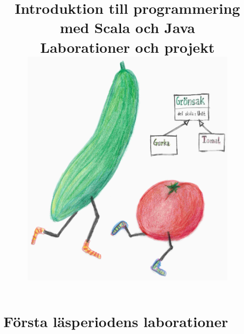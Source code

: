 \documentclass[a4paper]{compendium}
\title{
{\vspace{-3.0cm}\bf\sffamily\Huge\selectfont  Introduktion till programmering med Scala och Java}
\\ \vspace{1em}%
{\sffamily  Laborationer och projekt}\\\vspace{2cm}
\includegraphics[height=12cm]{cover/gurka.jpg}
}
\date{\raggedbottom%
\vspace{-2em}\begin{minipage}{1.0\textwidth}\centering
EDAA45, Lp1-2, HT 2016\\
Datavetenskap, LTH\\
Lunds Universitet\\
~\\
Kompileringsdatum: \today \\
\url{http://cs.lth.se/pgk}
\end{minipage}
}
\newcommand{\SlideHeading}[1]{} %
\begin{document}
\frontmatter
\maketitle

%
%

\setcounter{tocdepth}{2} %
\tableofcontents
\mainmatter


\renewcommand{\Lab}[1]{\newpage\chapter{Laboration: {\tt #1}}\label{section:lab:#1}}
\renewcommand{\Teamlab}[1]{\newpage\chapter{Grupplaboration: {\tt #1}}\label{section:lab:#1}}
\renewcommand{\subsection}{\section}


\part{Första läsperiodens laborationer}


%


%
%
\end{document}
